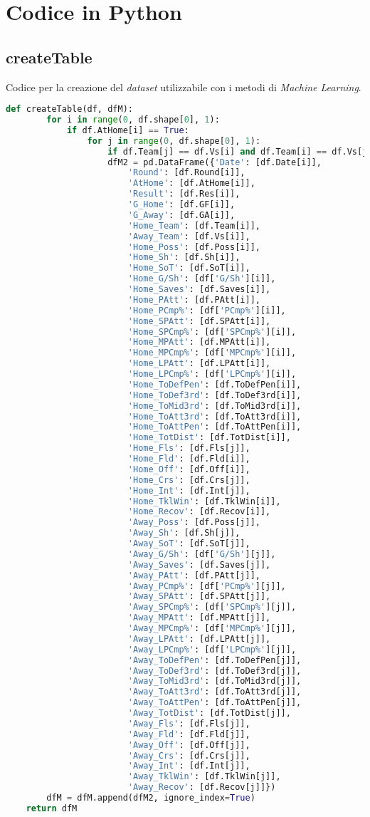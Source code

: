 \chapter{Codice in Python}
\section{createTable}
Codice per la creazione del \emph{dataset} utilizzabile con i metodi di \emph{Machine Learning}.
\begin{lstlisting}[language=Python, caption={Codice per la creazione del dataset utilizabile con i metodi di Machine Learning.}, captionpos=b, label=code:a9]
	def createTable(df, dfM): 
		for i in range(0, df.shape[0], 1):
			if df.AtHome[i] == True: 
				for j in range(0, df.shape[0], 1): 
					if df.Team[j] == df.Vs[i] and df.Team[i] == df.Vs[j] and df.AtHome[j] == False:
					dfM2 = pd.DataFrame({'Date': [df.Date[i]],
						'Round': [df.Round[i]],
						'AtHome': [df.AtHome[i]],
						'Result': [df.Res[i]],
						'G_Home': [df.GF[i]],
						'G_Away': [df.GA[i]],
						'Home_Team': [df.Team[i]],
						'Away_Team': [df.Vs[i]],
						'Home_Poss': [df.Poss[i]],
						'Home_Sh': [df.Sh[i]],
						'Home_SoT': [df.SoT[i]],
						'Home_G/Sh': [df['G/Sh'][i]],
						'Home_Saves': [df.Saves[i]],
						'Home_PAtt': [df.PAtt[i]],
						'Home_PCmp%': [df['PCmp%'][i]],
						'Home_SPAtt': [df.SPAtt[i]],
						'Home_SPCmp%': [df['SPCmp%'][i]],
						'Home_MPAtt': [df.MPAtt[i]],
						'Home_MPCmp%': [df['MPCmp%'][i]],
						'Home_LPAtt': [df.LPAtt[i]],
						'Home_LPCmp%': [df['LPCmp%'][i]],
						'Home_ToDefPen': [df.ToDefPen[i]],
						'Home_ToDef3rd': [df.ToDef3rd[i]],
						'Home_ToMid3rd': [df.ToMid3rd[i]],
						'Home_ToAtt3rd': [df.ToAtt3rd[i]],
						'Home_ToAttPen': [df.ToAttPen[i]],
						'Home_TotDist': [df.TotDist[i]],
						'Home_Fls': [df.Fls[j]],
						'Home_Fld': [df.Fld[i]],
						'Home_Off': [df.Off[i]],
						'Home_Crs': [df.Crs[j]],
						'Home_Int': [df.Int[j]],
						'Home_TklWin': [df.TklWin[i]],
						'Home_Recov': [df.Recov[i]],
						'Away_Poss': [df.Poss[j]],
						'Away_Sh': [df.Sh[j]],
						'Away_SoT': [df.SoT[j]],
						'Away_G/Sh': [df['G/Sh'][j]],
						'Away_Saves': [df.Saves[j]],
						'Away_PAtt': [df.PAtt[j]],
						'Away_PCmp%': [df['PCmp%'][j]],
						'Away_SPAtt': [df.SPAtt[j]],
						'Away_SPCmp%': [df['SPCmp%'][j]],
						'Away_MPAtt': [df.MPAtt[j]],
						'Away_MPCmp%': [df['MPCmp%'][j]],
						'Away_LPAtt': [df.LPAtt[j]],
						'Away_LPCmp%': [df['LPCmp%'][j]],
						'Away_ToDefPen': [df.ToDefPen[j]],
						'Away_ToDef3rd': [df.ToDef3rd[j]],
						'Away_ToMid3rd': [df.ToMid3rd[j]],
						'Away_ToAtt3rd': [df.ToAtt3rd[j]],
						'Away_ToAttPen': [df.ToAttPen[j]],
						'Away_TotDist': [df.TotDist[j]],
						'Away_Fls': [df.Fls[j]],
						'Away_Fld': [df.Fld[j]],
						'Away_Off': [df.Off[j]],
						'Away_Crs': [df.Crs[j]],
						'Away_Int': [df.Int[j]],
						'Away_TklWin': [df.TklWin[j]],
						'Away_Recov': [df.Recov[j]]})
		dfM = dfM.append(dfM2, ignore_index=True) 
	return dfM
	
\end{lstlisting}

